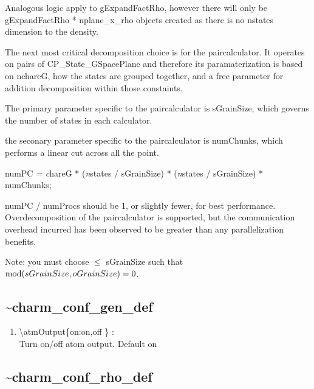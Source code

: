 \documentclass[12pt,titlepage]{article}
\begin{document}
Analogous logic apply to gExpandFactRho, however there will only be
gExpandFactRho * nplane\_x\_rho objects created as there is no nstates
dimension to the density.

The next most critical decomposition choice is for the paircalculator.
It operates on pairs of CP\_State\_GSpacePlane and therefore its
paramaterization is based on nchareG, how the states are grouped
together, and a free parameter for addition decomposition within those
constaints.

The primary parameter specific to the paircalculator is sGrainSize, which governs the number of states in each calculator.

the seconary parameter specific to the paircalculator is numChunks, which performs a linear cut across all the point.

numPC = {\emph chareG} *  ({\emph nstates / sGrainSize}) * ({\emph nstates / sGrainSize})  * numChunks;

numPC / numProcs should be 1, or slightly fewer, for best performance.  Overdecomposition of the paircalculator is supported, but the communication overhead incurred has been observed to be greater than any parallelization benefits. 

Note: you must choose $\leq$ sGrainSize such that ${\rm
  mod}(sGrainSize,oGrainSize)=0$.

\newpage
\subsection*{\bf \~{ }charm\_conf\_gen\_def}

\begin{enumerate}
  \vspace{0.15in} 
  \item  \textbackslash{}atmOutput\{on:on,off \} : \\   
  Turn on/off atom output. Default on
\end{enumerate}

\newpage
\subsection*{\bf \~{ }charm\_conf\_rho\_def}
\end{document}
